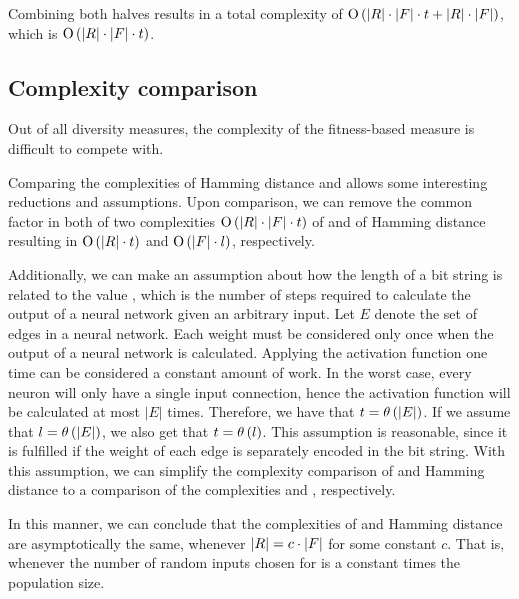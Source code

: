 Combining both halves results in a total complexity of $\operatorname{O}\left(\lvert R\rvert \cdot \lvert F\rvert \cdot t + \lvert R\rvert \cdot \lvert F\rvert\right)$, which is $\operatorname{O}\left(\lvert R\rvert\cdot\lvert F\rvert\cdot t\right)$.

\subsection{Complexity comparison}
Out of all diversity measures, the complexity of the fitness-based measure is difficult to compete with.

Comparing the complexities of Hamming distance and \dia{} allows some interesting reductions and assumptions. Upon comparison, we can remove the common factor \indset{} in both of two complexities $\operatorname{O}\left(\lvert R\rvert\cdot\lvert F\rvert\cdot t\right)$ of \dia{} and \bigO{\indsetl^2 \cdot \bitstringl} of Hamming distance resulting in $\operatorname{O}\left(\lvert R\rvert \cdot t\right)$ and $\operatorname{O}\left(\lvert F\rvert \cdot l\right)$, respectively. 

Additionally, we can make an assumption about how the length of a bit string \bitstringl{} is related to the value \timet, which is the number of steps required to calculate the output of a neural network given an arbitrary input. Let $E$ denote the set of edges in a neural network. Each weight must be considered only once when the output of a neural network is calculated. Applying the activation function one time can be considered a constant amount of work. In the worst case, every neuron will only have a single input connection, hence the activation function will be calculated at most $|E|$ times. Therefore, we have that $t = \theta\left(\lvert E\rvert\right)$. If we assume that $l = \theta\left(\lvert E\rvert\right)$, we also get that $t = \theta\left(l\right)$. This assumption is reasonable, since it is fulfilled if the weight of each edge is separately encoded in the bit string. With this assumption, we can simplify the complexity comparison of \dia{} and Hamming distance to a comparison of the complexities \bigO{\ransetl} and \bigO{\indsetl}, respectively.

In this manner, we can conclude that the complexities of \dia{} and Hamming distance are asymptotically the same, whenever $\lvert R\rvert = c \cdot \lvert F\rvert$ for some constant $c$. That is, whenever the number of random inputs chosen for \dia{} is a constant times the population size.
